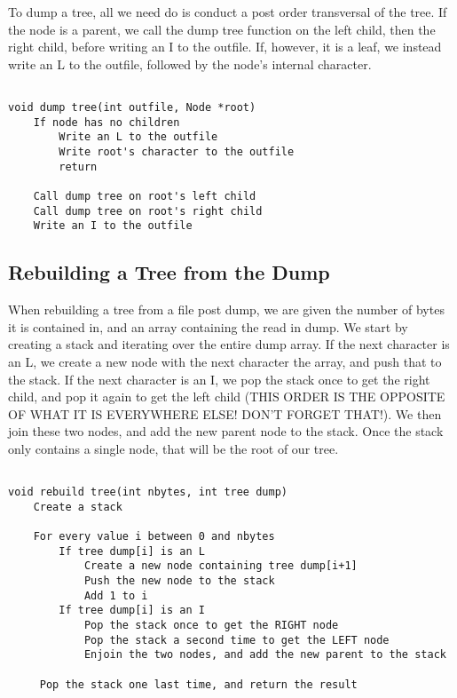 \documentclass[11pt]{article}
\begin{document}
To dump a tree, all we need do is conduct a post order transversal of the tree. If the node is a parent, we call the dump tree function on the left child, then the right child, before writing an I to the outfile. If, however, it is a leaf, we instead write an L to the outfile, followed by the node's internal character.

\begin{verbatim}

void dump tree(int outfile, Node *root)
    If node has no children
        Write an L to the outfile
        Write root's character to the outfile
        return

    Call dump tree on root's left child
    Call dump tree on root's right child
    Write an I to the outfile

\end{verbatim}

\subsection{Rebuilding a Tree from the Dump}

When rebuilding a tree from a file post dump, we are given the number of bytes it is contained in, and an array containing the read in dump. We start by creating a stack and iterating over the entire dump array. If the next character is an L, we create a new node with the next character the array, and push that to the stack. If the next character is an I, we pop the stack once to get the right child, and pop it again to get the left child (THIS ORDER IS THE OPPOSITE OF WHAT IT IS EVERYWHERE ELSE! DON'T FORGET THAT!). We then join these two nodes, and add the new parent node to the stack. Once the stack only contains a single node, that will be the root of our tree.

\begin{verbatim}

void rebuild tree(int nbytes, int tree dump)
    Create a stack

    For every value i between 0 and nbytes
        If tree dump[i] is an L
            Create a new node containing tree dump[i+1]
            Push the new node to the stack
            Add 1 to i
        If tree dump[i] is an I
            Pop the stack once to get the RIGHT node
            Pop the stack a second time to get the LEFT node
            Enjoin the two nodes, and add the new parent to the stack

     Pop the stack one last time, and return the result

\end{verbatim}
\end{document}
